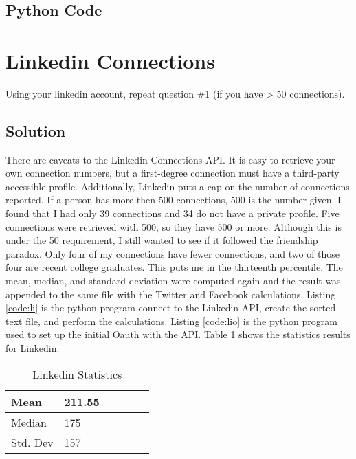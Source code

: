 \documentclass[paper=a4, fontsize=11pt]{scrartcl} %
\numberwithin{equation}{section} %
\numberwithin{figure}{section} %
\numberwithin{table}{section} %
\begin{document}
\newpage
\subsection{Python Code}


\newpage

\section{Linkedin Connections}
Using your linkedin account, repeat question \#1 (if you have >
50 connections).

\subsection{Solution}

 There are caveats to the Linkedin Connections API.
It is easy to retrieve your own connection numbers, but a first-degree connection must have a third-party accessible profile.
Additionally, Linkedin puts a cap on the number of connections reported.
If a person has more then 500 connections, 500 is the number given.\cite{bib:l-profile}
I found that I had only 39 connections and 34 do not have a private profile.
Five connections were retrieved with 500, so they have 500 or more.
Although this is under the 50 requirement, I still wanted to see if it followed the friendship paradox.
Only four of my connections have fewer connections, and two of those four are recent college graduates.
This puts me in the thirteenth percentile.
The mean, median, and standard deviation were computed again and the result was appended to the same file with the Twitter and Facebook calculations.
Listing \ref{code:li} is the python program connect to the Linkedin API, create the sorted text file, and perform the calculations. \cite{bib:py-linkedin}
Listing \ref{code:lio} is the python program used to set up the initial Oauth with the API.\cite{bib:l-oauth}
Table \ref{table:li-calc} shows the statistics results for Linkedin.

\begin{table}[H]
\centering
\begin{tabular}{|l|l|l|l|l|l|}
\hline
Mean &  211.55\\
\hline
Median &  175 \\
\hline
Std. Dev &  157\\
\hline
\end{tabular}
\caption{Linkedin Statistics}
\label{table:li-calc}
\end{table}
\end{document}
